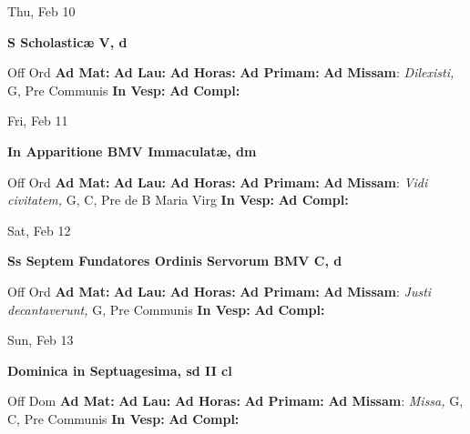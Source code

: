 \documentclass[10pt]{article}
\begin{document}
\begin{minipage}{3.5in}
\vspace{2em}\begin{center}
Thu, Feb 10
\end{center}\textbf{ \large S Scholasticæ V, \textnormal{\normalsize d}}
\begin{justify}
Off Ord
\textbf{Ad Mat: }
\textbf{Ad Lau: }
\textbf{Ad Horas: }
\textbf{Ad Primam: }
\textbf{Ad Missam}: \textit{Dilexisti,} G, Pre Communis
\textbf{In Vesp: }
\textbf{Ad Compl: }\end{justify}
\end{minipage}



\begin{minipage}{3.5in}
\vspace{2em}\begin{center}
Fri, Feb 11
\end{center}\textbf{ \large In Apparitione BMV Immaculatæ, \textnormal{\normalsize dm}}
\begin{justify}
Off Ord
\textbf{Ad Mat: }
\textbf{Ad Lau: }
\textbf{Ad Horas: }
\textbf{Ad Primam: }
\textbf{Ad Missam}: \textit{Vidi civitatem,} G, C, Pre de B Maria Virg
\textbf{In Vesp: }
\textbf{Ad Compl: }\end{justify}
\end{minipage}



\begin{minipage}{3.5in}
\vspace{2em}\begin{center}
Sat, Feb 12
\end{center}\textbf{ \large Ss Septem Fundatores Ordinis Servorum BMV C, \textnormal{\normalsize d}}
\begin{justify}
Off Ord
\textbf{Ad Mat: }
\textbf{Ad Lau: }
\textbf{Ad Horas: }
\textbf{Ad Primam: }
\textbf{Ad Missam}: \textit{Justi decantaverunt,} G, Pre Communis
\textbf{In Vesp: }
\textbf{Ad Compl: }\end{justify}
\end{minipage}



\begin{minipage}{3.5in}
\vspace{2em}\begin{center}
Sun, Feb 13
\end{center}\textbf{ \large Dominica in Septuagesima, \textnormal{\normalsize sd II cl}}
\begin{justify}
Off Dom
\textbf{Ad Mat: }
\textbf{Ad Lau: }
\textbf{Ad Horas: }
\textbf{Ad Primam: }
\textbf{Ad Missam}: \textit{Missa,} G, C, Pre Communis
\textbf{In Vesp: }
\textbf{Ad Compl: }\end{justify}
\end{minipage}
\end{document}
